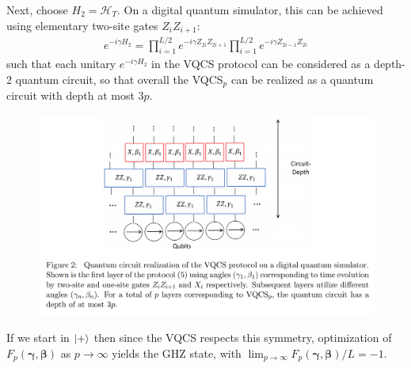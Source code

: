 \documentclass{book}
\theoremstyle{definition}
\newcommand{\had}{\mathcal{H}}
\begin{document}
Next, choose $H_2 = \had_T$. On a digital quantum simulator, this can be achieved using elementary two-site gates $Z_i Z_{i+1}$: 
\begin{align}
e^{-i\gamma H_2} = \prod^{L/2}_{i=1} e^{-i\gamma Z_{2i}Z_{2i+1}}   \prod^{L/2}_{i=1} e^{-i\gamma Z_{2i-1}Z_{2i}}
\end{align}
such that each unitary $e^{-i\gamma H_2}$ in the VQCS protocol can be considered as a depth-2 quantum circuit, so that overall the VQCS$_p$ can be realized as a quantum circuit with depth at most $3p$. 
\begin{figure}[!htb]
	\centering
	\includegraphics[scale=0.3]{vqcs}
\end{figure}
If we start in $\ket{+}$ then since the VQCS respects this symmetry, optimization of $F_p(\bm\gamma,\bm\beta)$ as $p\to \infty$ yields the GHZ state, with $\lim_{p\to \infty} F_p(\bm\gamma,\bm\beta)/L = -1$. \\
\end{document}

